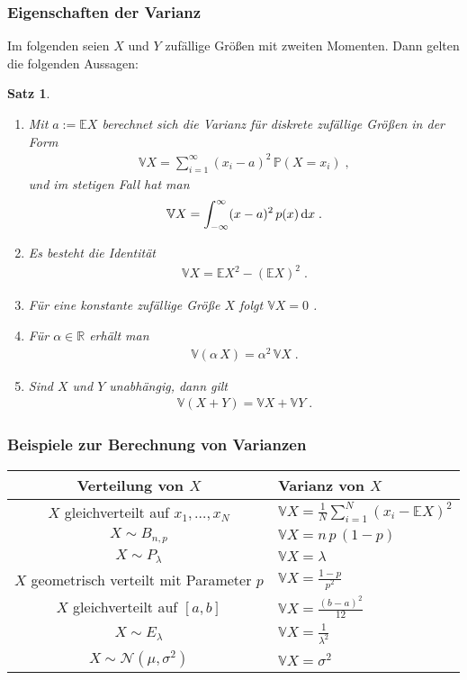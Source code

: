\documentclass[ngerman,draft,parskip=half,twoside]{scrartcl}
\newtheorem{thm}{Satz}[section]
\newcommand*{\R}{\mathbb{R}}      %
\newcommand*{\E}{\mathbb{E}}        %
\newcommand*{\V}{\mathbb{V}}        %
\newcommand*{\WKM}{\mathbb{P}}      %
\newcommand*{\NormVert}{\mathcal{N}} %
\newcommand*{\diff}[1]{%
  \mathop{\mathrm{\mathstrut d}}%
  \ifx#1(\else%
  \ifx#1[\else%
  \ifx#1\{\else%
    \!%
  \fi\fi\fi#1%
}
\begin{document}
\subsubsection{Eigenschaften der Varianz}
Im folgenden seien $X$ und $Y$ zufällige Größen mit zweiten Momenten. Dann gelten die
folgenden Aussagen:
\begin{thm}~
\begin{enumerate}
\item
Mit $a:=\E X$ berechnet sich die Varianz für diskrete zufällige Größen in der Form
  \begin{gather*}
    \V X = \sum_{i=1}^\infty (x_i-a)^2\,\WKM(X=x_i)\;,
  \end{gather*}
und im stetigen Fall hat man
  \begin{gather*}
    \V X =\int_{-\infty}^\infty (x-a)^2\,p(x)\diff{x}\;.
  \end{gather*}
\item
Es besteht die Identität
  \begin{gather*}
    \V X = \E X^2 -(\E X)^2\;.
  \end{gather*}
\item
Für eine konstante zufällige Größe $X$ folgt $\V X=0$ .
\item
Für $\alpha\in\R$ erhält man
  \begin{gather*}
    \V(\alpha\,X)=\alpha^2\,\V X\;.
  \end{gather*}
\item
Sind $X$ und $Y$ unabhängig, dann gilt
  \begin{gather*}
    \V(X+Y)=\V X + \V Y\;.
  \end{gather*}
\end{enumerate}

\end{thm}
\subsubsection{Beispiele zur Berechnung von Varianzen}

\medskip

{\renewcommand{\arraystretch}{1.4}
\begin{center}
\begin{tabular}{|c|l|}\hline
\bf Verteilung von $X$& \bf Varianz von $X$\\ \hline\hline
$X$ gleichverteilt auf $x_1,\ldots,x_N$& $\V X=\frac{1}{N}\sum_{i=1}^N (x_i-\E X)^2$\\ \hline
$X\sim B_{n,p}$& $\V X= n\,p\,(1-p)$\\ \hline
$X\sim P_\lambda$&$\V X= \lambda$\\ \hline
$X$ geometrisch verteilt mit Parameter $p$& $\V X = \frac{1-p}{p^2}$\\ \hline
$X$ gleichverteilt auf $[a,b]$& $\V X= \frac{(b-a)^2}{12}$\\ \hline
$X\sim E_\lambda$& $\V X = \frac{1}{\lambda^2}$\\ \hline
$X\sim \NormVert(\mu,\sigma^2)$&$ \V X = \sigma^2$\\ \hline
\end{tabular}
\end{center}
}
\end{document}
